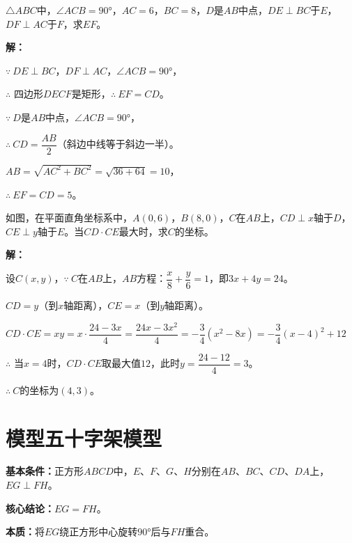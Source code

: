 \documentclass[12pt, a4paper]{ctexart}
\begin{document}
\begin{examplebox}
$\triangle ABC$中，$\angle ACB = 90°$，$AC = 6$，$BC = 8$，$D$是$AB$中点，$DE \perp BC$于$E$，$DF \perp AC$于$F$，求$EF$。
\end{examplebox}

\textbf{解：}

$\because\ DE \perp BC$，$DF \perp AC$，$\angle ACB = 90°$，

$\therefore$ 四边形$DECF$是矩形，$\therefore\ EF = CD$。

$\because\ D$是$AB$中点，$\angle ACB = 90°$，

$\therefore\ CD = \dfrac{AB}{2}$（斜边中线等于斜边一半）。

$AB = \sqrt{AC^2 + BC^2} = \sqrt{36 + 64} = 10$，

$\therefore\ EF = CD = \boxed{5}$。

\begin{examplebox}[【例题8】坐标系中的K字模型]
如图，在平面直角坐标系中，$A(0,6)$，$B(8,0)$，$C$在$AB$上，$CD \perp x$轴于$D$，$CE \perp y$轴于$E$。当$CD \cdot CE$最大时，求$C$的坐标。
\end{examplebox}

\textbf{解：}

设$C(x,y)$，$\because\ C$在$AB$上，$AB$方程：$\dfrac{x}{8} + \dfrac{y}{6} = 1$，即$3x + 4y = 24$。

$CD = y$（到$x$轴距离），$CE = x$（到$y$轴距离）。

$CD \cdot CE = xy = x \cdot \dfrac{24 - 3x}{4} = \dfrac{24x - 3x^2}{4} = -\dfrac{3}{4}(x^2 - 8x) = -\dfrac{3}{4}(x-4)^2 + 12$

$\therefore$ 当$x = 4$时，$CD \cdot CE$取最大值$12$，此时$y = \dfrac{24-12}{4} = 3$。

$\therefore\ C$的坐标为$\boxed{(4,3)}$。

\newpage
\section*{\textcolor{modelteal}{模型五\quad 十字架模型}}

\begin{modelbox}
\textbf{基本条件：}正方形$ABCD$中，$E$、$F$、$G$、$H$分别在$AB$、$BC$、$CD$、$DA$上，$EG \perp FH$。

\textbf{核心结论：}$EG = FH$。

\textbf{本质：}将$EG$绕正方形中心旋转$90°$后与$FH$重合。
\end{modelbox}
\end{document}
